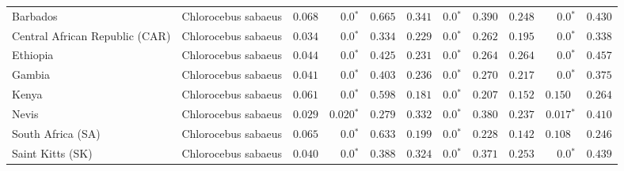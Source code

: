 \documentclass{article}
\begin{document}
\begin{table*}[!ht]
\begin{adjustbox}{width = 1\textwidth}
\begin{tabular}{||l|l||r|r|r||r|r|r||r|r|r||}
                \rowcolor{LIGHTGREY} Barbados                       & Chlorocebus sabaeus & $ 0.068$ & $\bm{0.0{^*}}$    & $ 0.665$                                                                     & $ 0.341$                      & $\bm{0.0{^*}}$ & $ 0.390$ & $ 0.248$ & $\bm{0.0{^*}}$ & $ 0.430$ \\
                \rowcolor{LIGHTGREY} Central African Republic (CAR) & Chlorocebus sabaeus & $ 0.034$                      & $\bm{0.0{^*}}$                  & $ 0.334$ & $ 0.229$ & $\bm{0.0{^*}}$ & $ 0.262$ & $ 0.195$ & $\bm{0.0{^*}}$ & $ 0.338$ \\
                \rowcolor{LIGHTGREY} Ethiopia                       & Chlorocebus sabaeus & $ 0.044$ & $\bm{0.0{^*}}$    & $ 0.425$                                                                     & $ 0.231$                      & $\bm{0.0{^*}}$ & $ 0.264$ & $ 0.264$ & $\bm{0.0{^*}}$ & $ 0.457$ \\
                \rowcolor{LIGHTGREY} Gambia                         & Chlorocebus sabaeus & $ 0.041$ & $\bm{0.0{^*}}$    & $ 0.403$                                                                     & $ 0.236$                      & $\bm{0.0{^*}}$ & $ 0.270$ & $ 0.217$ & $\bm{0.0{^*}}$ & $ 0.375$ \\
                \rowcolor{LIGHTGREY} Kenya                          & Chlorocebus sabaeus & $ 0.061$ & $\bm{0.0{^*}}$    & $ 0.598$ & $ 0.181$                      & $\bm{0.0{^*}}$ & $ 0.207$ & $ 0.152$ & $ 0.150~~$ & $ 0.264$ \\
                \rowcolor{LIGHTGREY} Nevis                          & Chlorocebus sabaeus & $ 0.029$ & $\bm{ 0.020{^*}}$ & $ 0.279$                                                                     & $ 0.332$                      & $\bm{0.0{^*}}$ & $ 0.380$ & $ 0.237$ & $\bm{ 0.017{^*}}$ & $ 0.410$ \\
                \rowcolor{LIGHTGREY} South Africa (SA)              & Chlorocebus sabaeus & $ 0.065$ & $\bm{0.0{^*}}$                  & $ 0.633$                                                                     & $ 0.199$                      & $\bm{0.0{^*}}$ & $ 0.228$ & $ 0.142$ & $ 0.108~~$ & $ 0.246$ \\
                \rowcolor{LIGHTGREY} Saint Kitts (SK)               & Chlorocebus sabaeus & $ 0.040$ & $\bm{0.0{^*}}$                  & $ 0.388$                                                                     & $ 0.324$                      & $\bm{0.0{^*}}$ & $ 0.371$ & $ 0.253$ & $\bm{0.0{^*}}$ & $ 0.439$ \\

\end{tabular}
\end{adjustbox}
\end{table*}
\end{document}
